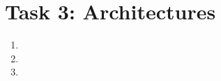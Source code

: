 \documentclass{scrartcl}
\begin{document}
	\section*{Task 3: Architectures}
	\begin{center}
	\end{center}
	\begin{enumerate}
		\item
		\item
		\item
	\end{enumerate}
	
\end{document}
